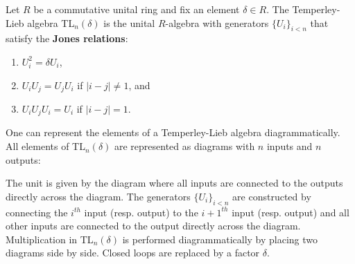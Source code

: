     \begin{example}
        Let $R$ be a commutative unital ring and fix an element $\delta\in R$. The Temperley-Lieb algebra TL$_n(\delta)$ is the unital $R$-algebra with generators $\{U_i\}_{i<n}$ that satisfy the \textbf{Jones relations}:
        \begin{enumerate}
            \item $U_i^2 = \delta U_i$,
            \item $U_i U_j = U_j U_i$ if $|i-j|\neq 1$, and
            \item $U_i U_j U_i = U_i$ if $|i-j| = 1$.
        \end{enumerate}
        One can represent the elements of a Temperley-Lieb algebra diagrammatically. All elements of TL$_n(\delta)$ are represented as diagrams with $n$ inputs and $n$ outputs:

        \qquad The unit is given by the diagram where all inputs are connected to the outputs directly across the diagram. The generators $\{U_i\}_{i<n}$ are constructed by connecting the $i^{th}$ input (resp. output) to the $i+1^{th}$ input (resp. output) and all other inputs are connected to the output directly across the diagram.
        Multiplication in TL$_n(\delta)$ is performed diagrammatically by placing two diagrams side by side. Closed loops are replaced by a factor $\delta$.


\end{example}
